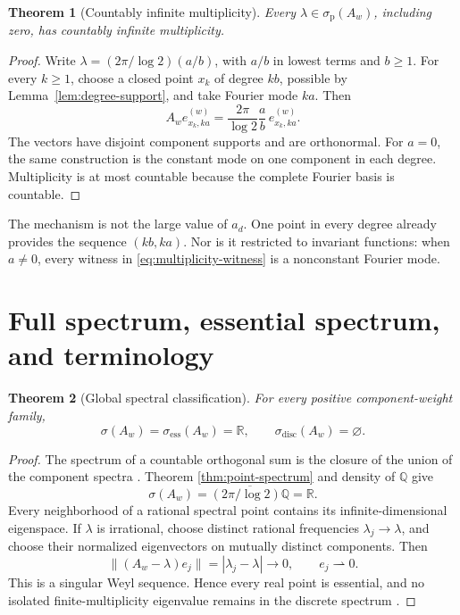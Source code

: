 \documentclass[11pt]{article}
\newtheorem{theorem}{Theorem}
\theoremstyle{definition}
\theoremstyle{remark}
\newcommand{\R}{\mathbb{R}}
\newcommand{\Q}{\mathbb{Q}}
\begin{document}
\begin{theorem}[Countably infinite multiplicity]
\label{thm:multiplicity}
Every \(\lambda\in\sigma_{\mathrm p}(A_w)\), including zero, has countably
infinite multiplicity.
\end{theorem}

\begin{proof}
Write \(\lambda=(2\pi/\log2)(a/b)\), with \(a/b\) in lowest terms and
\(b\geq1\).  For every \(k\geq1\), choose a closed point \(x_k\) of degree
\(kb\), possible by Lemma~\ref{lem:degree-support}, and take Fourier mode
\(ka\).  Then
\begin{equation}
 A_we_{x_k,ka}^{(w)}
 =\frac{2\pi}{\log2}\frac ab\,e_{x_k,ka}^{(w)}.
 \label{eq:multiplicity-witness}
\end{equation}
The vectors have disjoint component supports and are orthonormal.  For
\(a=0\), the same construction is the constant mode on one component in each
degree.  Multiplicity is at most countable because the complete Fourier basis
is countable.
\end{proof}

The mechanism is not the large value of \(a_d\).  One point in every degree
already provides the sequence \((kb,ka)\).  Nor is it restricted to invariant
functions: when \(a\neq0\), every witness in
\eqref{eq:multiplicity-witness} is a nonconstant Fourier mode.

\section{Full spectrum, essential spectrum, and terminology}
\label{sec:full-spectrum}

\begin{theorem}[Global spectral classification]
\label{thm:global-spectrum}
For every positive component-weight family,
\begin{equation}
 \boxed{\displaystyle
 \sigma(A_w)=\sigma_{\mathrm{ess}}(A_w)=\R,
 \qquad \sigma_{\mathrm{disc}}(A_w)=\varnothing.}
 \label{eq:global-spectrum}
\end{equation}
\end{theorem}

\begin{proof}
The spectrum of a countable orthogonal sum is the closure of the union of
the component spectra \citep[Thm.~2.23]{Teschl2009}.  Theorem
\ref{thm:point-spectrum} and density of \(\Q\) give
\[
 \sigma(A_w)=\overline{(2\pi/\log2)\Q}=\R.
\]
Every neighborhood of a rational spectral point contains its
infinite-dimensional eigenspace.  If \(\lambda\) is irrational, choose
distinct rational frequencies \(\lambda_j\to\lambda\), and choose their
normalized eigenvectors on mutually distinct components.  Then
\[
 \|(A_w-\lambda)e_j\|=|\lambda_j-\lambda|\longrightarrow0,
 \qquad e_j\rightharpoonup0.
\]
This is a singular Weyl sequence.  Hence every real point is essential, and
no isolated finite-multiplicity eigenvalue remains in the discrete spectrum
\citep[Secs.~6.2--6.4]{Teschl2009}.
\end{proof}
\end{document}
